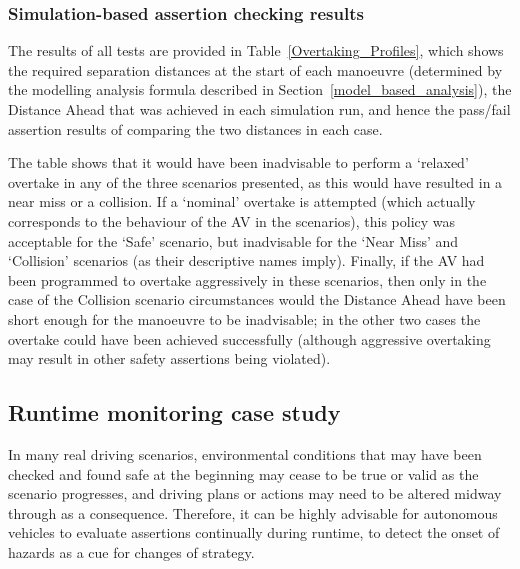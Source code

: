 
\subsubsection{Simulation-based assertion checking results} \label{sim_results}

The results of all tests are provided in Table~\ref{Overtaking_Profiles}, which shows the required separation distances at the start of each manoeuvre (determined by the modelling analysis formula described in Section~\ref{model_based_analysis}), the Distance Ahead that was achieved in each simulation run, and hence the pass/fail assertion results of comparing the two distances in each case.



The table shows that it would have been inadvisable to perform a `relaxed' overtake in any of the three scenarios presented, as this would have resulted in a near miss or a collision. If a `nominal' overtake is attempted (which actually corresponds to the behaviour of the AV in the scenarios), this policy was acceptable for the `Safe' scenario, but inadvisable for the `Near Miss' and `Collision' scenarios (as their descriptive names imply). Finally, if the AV had been programmed to overtake aggressively in these scenarios, then only in the case of the Collision scenario circumstances would the Distance Ahead have been short enough for the manoeuvre to be inadvisable; in the other two cases the overtake could have been achieved successfully (although aggressive overtaking may result in other safety assertions being violated).

\subsection{Runtime monitoring case study}
In many real driving scenarios, environmental conditions that may have been checked and found safe at the beginning may cease to be true or valid as the scenario progresses, and driving plans or actions may need to be altered midway through as a consequence. Therefore, it can be highly advisable for autonomous vehicles to evaluate assertions continually during runtime, to detect the onset of hazards as a cue for changes of strategy.

